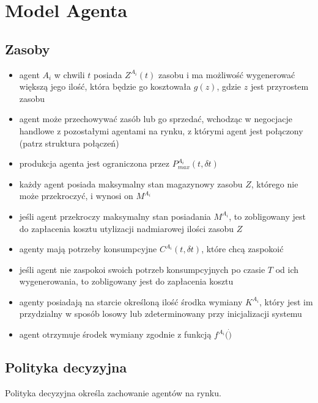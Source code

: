 \documentclass[]{article}
\providecommand{\tightlist}{%
  \setlength{\itemsep}{0pt}\setlength{\parskip}{0pt}}
\begin{document}
\hypertarget{model-agenta}{%
\section{Model Agenta}\label{model-agenta}}

\hypertarget{zasoby}{%
\subsection{Zasoby}\label{zasoby}}

\begin{itemize}
\tightlist
\item
  agent \(A_i\) w chwili \(t\) posiada \(Z^{A_i}(t)\) zasobu i ma
  możliwość wygenerować większą jego ilość, która będzie go kosztowała
  \(g(z)\), gdzie \(z\) jest przyrostem zasobu
\item
  agent może przechowywać zasób lub go sprzedać, wchodząc w negocjacje
  handlowe z pozostałymi agentami na rynku, z którymi agent jest
  połączony (patrz struktura połączeń)
\item
  produkcja agenta jest ograniczona przez \(P^{A_i}_{max}(t, \delta t)\)
\item
  każdy agent posiada maksymalny stan magazynowy zasobu \(Z\), którego
  nie może przekroczyć, i wynosi on \(M^{A_i}\)
\item
  jeśli agent przekroczy maksymalny stan posiadania \(M^{A_i}\), to
  zobligowany jest do zapłacenia kosztu utylizacji nadmiarowej ilości
  zasobu \(Z\)
\item
  agenty mają potrzeby konsumpcyjne \(C^{A_i}(t, \delta t)\), które chcą
  zaspokoić
\item
  jeśli agent nie zaspokoi swoich potrzeb konsumpcyjnych po czasie \(T\)
  od ich wygenerowania, to zobligowany jest do zapłacenia kosztu
\item
  agenty posiadają na starcie określoną ilość środka wymiany
  \(K^{A_i}\), który jest im przydzialny w sposób losowy lub
  zdeterminowany przy inicjalizacji systemu
\item
  agent otrzymuje środek wymiany zgodnie z funkcją \(f^{A_i}(\dot)\)
\end{itemize}

\hypertarget{polityka-decyzyjna}{%
\subsection{Polityka decyzyjna}\label{polityka-decyzyjna}}

Polityka decyzyjna określa zachowanie agentów na rynku.
\end{document}
